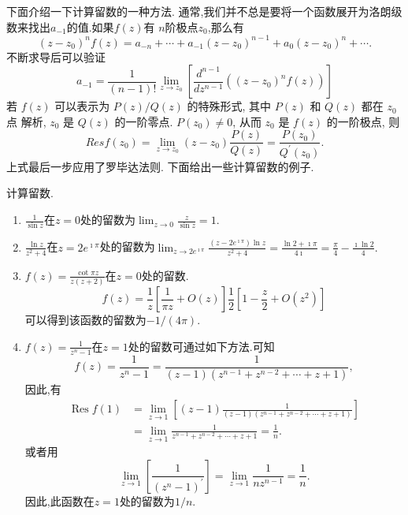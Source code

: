 下面介绍一下计算留数的一种方法.
通常,我们并不总是要将一个函数展开为洛朗级数来找出$a_{-1}$的值.如果$f(z)$有
$n$阶极点$z_0$,那么有
\begin{equation}
    \left(z-z_0\right)^n f(z)=a_{-n}+\cdots+a_{-1}\left(z-z_0\right)^{n-1}+a_0\left(z-z_0\right)^n+\cdots .
\end{equation}
不断求导后可以验证
\begin{equation}
    a_{-1}=\frac{1}{(n-1) !} \lim _{z \to z_0}\left[\frac{d^{n-1}}{d z^{n-1}}\left(\left(z-z_0\right)^n f(z)\right)\right]
\end{equation}
若 $f(z)$ 可以表示为 $P(z) / Q(z)$ 的特殊形式, 其中 $P(z)$ 和 $Q(z)$ 都在 $z_0$ 点 解析, $z_0$ 是 $Q(z)$ 的一阶零点. $P\left(z_0\right) \neq 0$, 从而 $z_0$ 是 $f(z)$ 的一阶极点, 则
\begin{equation}
    Res f\left(z_0\right)=\lim _{z \to z_0}\left(z-z_0\right) \frac{P(z)}{Q(z)}=\frac{P\left(z_0\right)}{Q^{\prime}\left(z_0\right)} .
\end{equation}
上式最后一步应用了罗毕达法则.
下面给出一些计算留数的例子.
\begin{examplebox}{计算留数.}
    
    \begin{enumerate}
        \item $\frac{1}{\sin z}$在$z=0$处的留数为$\lim_{z\to 0} \frac{z}{\sin{z}} = 1$.
        \item $\frac{\ln{z}}{z^2 + 4}$在$z=2e^{\imath \pi}$处的留数为$\lim_{z\to 2e^{\imath \pi}} \frac{(z-2e^{\imath \pi})\ln{z} }{z^2 + 4} = 
        \frac{\ln 2 + \imath \pi}{4\imath} = \frac{\pi}{4} - \frac{\imath\ln{2}}{4}.$
        \item $f(z) = \frac{\cot{\pi z}}{z(z+2)}$在$z=0$处的留数.\\
            $$
              f(z) = \frac{1}{z} \left[\frac{1}{\pi z} + O(z) \right]\frac{1}{2} \left[1 - \frac{z}{2} + O(z^2)\right]  
            $$
            可以得到该函数的留数为$-1/(4\pi)$.
        \item $f(z) = \frac{1}{z^n - 1}$在$z=1$处的留数可通过如下方法.可知
        $$
            f(z)=\frac{1}{z^n-1}=\frac{1}{(z-1)\left(z^{n-1}+z^{n-2}+\cdots+z+1\right)},
        $$
        因此,有
        $$
            \begin{aligned}
                \operatorname{Res} f(1) & =\lim _{z \to 1}\left[(z-1) \frac{1}{(z-1)\left(z^{n-1}+z^{n-2}+\cdots+z+1\right)}\right] \\
                & =\lim _{z \to 1} \frac{1}{z^{n-1}+z^{n-2}+\cdots+z+1}=\frac{1}{n} .
            \end{aligned}
        $$
        或者用 $$
        \lim _{z \to 1}\left[\frac{1}{\left(z^n-1\right)^{\prime}}\right]=\lim _{z \to 1} \frac{1}{n z^{n-1}}=\frac{1}{n} .
        $$ 因此,此函数在$z=1$处的留数为$1/n$.
    \end{enumerate}
\end{examplebox}


